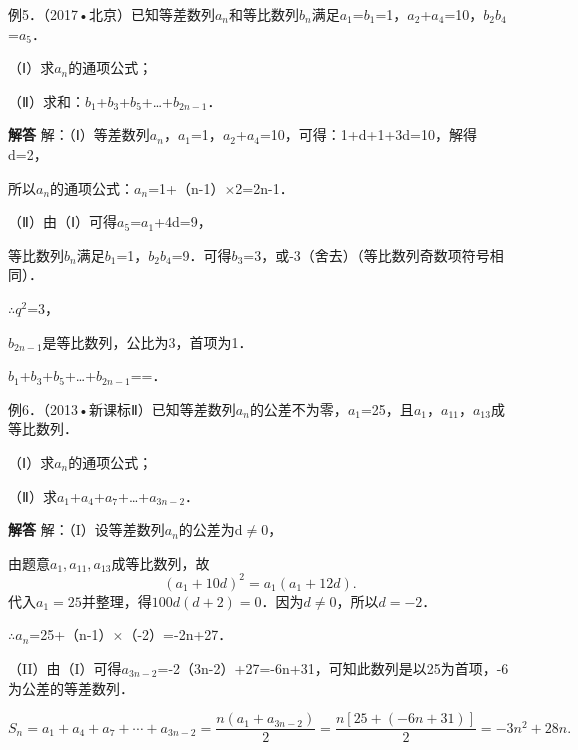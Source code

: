 例5．（2017•北京）已知等差数列{\ensuremath{a_{n}}}和等比数列{\ensuremath{b_{n}}}满足\ensuremath{a_{1}}=\ensuremath{b_{1}}=1，\ensuremath{a_{2}}+\ensuremath{a_{4}}=10，\ensuremath{b_{2}}\ensuremath{b_{4}}=\ensuremath{a_{5}}．\par
（Ⅰ）求{\ensuremath{a_{n}}}的通项公式；\par
（Ⅱ）求和：\ensuremath{b_{1}}+\ensuremath{b_{3}}+\ensuremath{b_{5}}+\ldots{}+\ensuremath{b_{2n-1}}．\par
\QuestionSpace{4.8cm}
\ifshowanswers
\par\begingroup\color{solutioncolor}\noindent\textbf{解答}\quad
解：（Ⅰ）等差数列{\ensuremath{a_{n}}}，\ensuremath{a_{1}}=1，\ensuremath{a_{2}}+\ensuremath{a_{4}}=10，可得：1+d+1+3d=10，解得d=2，\par
所以{\ensuremath{a_{n}}}的通项公式：\ensuremath{a_{n}}=1+（n-1）\ensuremath{\times}2=2n-1．\par
（Ⅱ）由（Ⅰ）可得\ensuremath{a_{5}}=\ensuremath{a_{1}}+4d=9，\par
等比数列{\ensuremath{b_{n}}}满足\ensuremath{b_{1}}=1，\ensuremath{b_{2}}\ensuremath{b_{4}}=9．可得\ensuremath{b_{3}}=3，或-3（舍去）（等比数列奇数项符号相同）．\par
\ensuremath{\therefore}\ensuremath{q^{2}}=3，\par
{\ensuremath{b_{2n-1}}}是等比数列，公比为3，首项为1．\par
\ensuremath{b_{1}}+\ensuremath{b_{3}}+\ensuremath{b_{5}}+\ldots{}+\ensuremath{b_{2n-1}}==．\par
\par\endgroup\fi

例6．（2013•新课标Ⅱ）已知等差数列{\ensuremath{a_{n}}}的公差不为零，\ensuremath{a_{1}}=25，且\ensuremath{a_{1}}，\ensuremath{a_{11}}，\ensuremath{a_{13}}成等比数列．\par
（Ⅰ）求{\ensuremath{a_{n}}}的通项公式；\par
（Ⅱ）求\ensuremath{a_{1}}+\ensuremath{a_{4}}+\ensuremath{a_{7}}+\ldots{}+\ensuremath{a_{3n-2}}．\par
\QuestionSpace{4.8cm}
\ifshowanswers
\par\begingroup\color{solutioncolor}\noindent\textbf{解答}\quad
解：（I）设等差数列{\ensuremath{a_{n}}}的公差为d\ensuremath{\ne}0，\par
由题意$a_1,a_{11},a_{13}$成等比数列，故
\[
(a_1+10d)^2=a_1(a_1+12d).
\]
代入$a_1=25$并整理，得$100d(d+2)=0$．因为$d\ne0$，所以$d=-2$．\par
\ensuremath{\therefore}\ensuremath{a_{n}}=25+（n-1）\ensuremath{\times}（-2）=-2n+27．\par
（II）由（I）可得\ensuremath{a_{3n-2}}=-2（3n-2）+27=-6n+31，可知此数列是以25为首项，-6为公差的等差数列．\par
\[
S_n=a_1+a_4+a_7+\cdots+a_{3n-2}
=\frac{n(a_1+a_{3n-2})}{2}
=\frac{n[25+(-6n+31)]}{2}
=-3n^2+28n.
\]
\par\endgroup\fi

